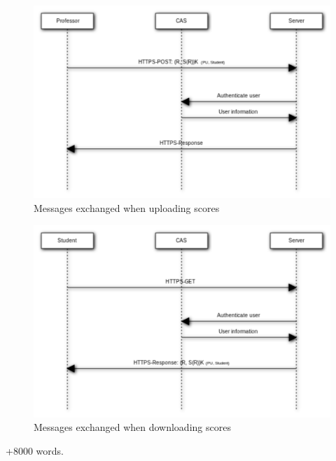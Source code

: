 \documentclass{article}
\begin{document}
\begin{figure}
\begin{center}
\includegraphics[width=\textwidth]{images/upload_scores.pdf}
\caption{Messages exchanged when uploading scores}
\label{fig:log-in}
\end{center}
\end{figure}

\begin{figure}
\begin{center}
\includegraphics[width=\textwidth]{images/download_scores.pdf}
\caption{Messages exchanged when downloading scores}
\label{fig:log-in}
\end{center}
\end{figure}

+8000 words.
\end{document}
